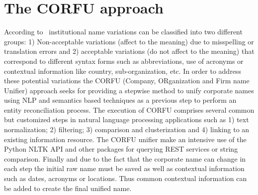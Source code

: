 \documentclass{llncs}
\begin{document}
\section{The CORFU approach}
According to~\cite{Galvez2006,Morillo:2013:TAA:2424697.2424727} institutional name variations can be 
classified into two different groups: 1) Non-acceptable variations (affect to the meaning) due to misspelling or translation errors and 
2) acceptable variations (do not affect to the meaning) that correspond to different syntax forms such as abbreviations, use of acronyms or contextual 
information like country, sub-organization, etc. In order to address these potential variations the CORFU (Company, ORganization and Firm name Unifier) approach 
seeks for providing a stepwise method to unify corporate names using NLP and semantics based techniques as a previous step to perform 
an entity reconciliation process. The execution of CORFU comprises several common but customized steps in natural language processing applications such as 
1) text normalization; 2) filtering; 3) comparison and clusterization and 4) linking to an existing information resource. The CORFU unifier 
make an intensive use of the Python NLTK API and other packages for querying REST services or string comparison. Finally and 
due to the fact that the corporate name can change in each step the initial raw name must be saved as well as contextual information such as dates, acronyms or locations. 
Thus common contextual information can be added to create the final unified name.
\end{document}
